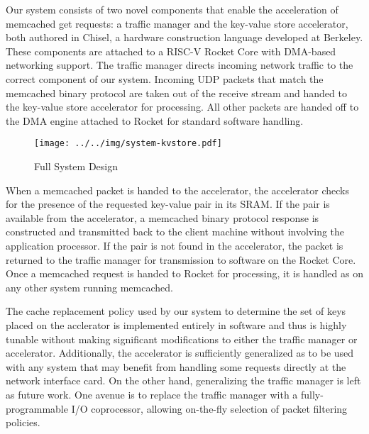 Our system consists of two novel components that enable the acceleration of 
memcached get requests: a traffic manager and the key-value store accelerator, 
both authored in Chisel, a hardware construction language developed at Berkeley.
These components are attached to a RISC-V Rocket Core with DMA-based networking 
support. The traffic manager directs incoming network traffic to the correct 
component of our system. Incoming UDP packets that match the memcached binary 
protocol are taken out of the receive stream and handed to the key-value store 
accelerator for processing. All other packets are handed off to the DMA 
engine attached to Rocket for standard software handling.

\begin{figure}[t]
\begin{center}
\texttt{[image: ../../img/system-kvstore.pdf]}
\caption{Full System Design}
\label{fig:full-sys}
\end{center}
\end{figure}

When a memcached packet is handed to the accelerator, the accelerator checks 
for the presence of the requested key-value pair in its SRAM. If the pair is
available from the accelerator, a memcached binary protocol response is 
constructed and transmitted back to the client machine without involving the 
application processor. If the pair is not found in the accelerator, the packet 
is returned to the traffic manager for transmission to software on the Rocket 
Core. Once a memcached request is handed to Rocket for processing, it is 
handled as on any other system running memcached.

The cache replacement policy used by our system to determine the set of keys
placed on the acclerator is implemented entirely in software and thus is 
highly tunable without making significant modifications to either the traffic
manager or accelerator. Additionally, the accelerator is sufficiently 
generalized as to be used with any system that may benefit from handling some
requests directly at the network interface card. On the other hand, 
generalizing the traffic manager is left as future work. One avenue is to 
replace the traffic manager with a fully-programmable I/O coprocessor, allowing
on-the-fly selection of packet filtering policies.



